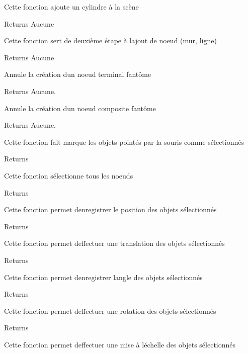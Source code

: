 Cette fonction ajoute un cylindre à la scène

\begin{DoxyReturn}{Returns}
Aucune
\end{DoxyReturn}
Cette fonction sert de deuxième étape à l\textquotesingle{}ajout de noeud (mur, ligne)

\begin{DoxyReturn}{Returns}
Aucune
\end{DoxyReturn}
Annule la création d\textquotesingle{}un noeud terminal fantôme

\begin{DoxyReturn}{Returns}
Aucune.
\end{DoxyReturn}
Annule la création d\textquotesingle{}un noeud composite fantôme

\begin{DoxyReturn}{Returns}
Aucune.
\end{DoxyReturn}
Cette fonction fait marque les objets pointés par la souris comme sélectionnés

\begin{DoxyReturn}{Returns}

\end{DoxyReturn}
Cette fonction sélectionne tous les noeuds

\begin{DoxyReturn}{Returns}

\end{DoxyReturn}
Cette fonction permet d\textquotesingle{}enregistrer le position des objets sélectionnés

\begin{DoxyReturn}{Returns}

\end{DoxyReturn}
Cette fonction permet d\textquotesingle{}effectuer une translation des objets sélectionnés

\begin{DoxyReturn}{Returns}

\end{DoxyReturn}
Cette fonction permet d\textquotesingle{}enregistrer l\textquotesingle{}angle des objets sélectionnés

\begin{DoxyReturn}{Returns}

\end{DoxyReturn}
Cette fonction permet d\textquotesingle{}effectuer une rotation des objets sélectionnés

\begin{DoxyReturn}{Returns}

\end{DoxyReturn}
Cette fonction permet d\textquotesingle{}effectuer une mise à l\textquotesingle{}échelle des objets sélectionnés

